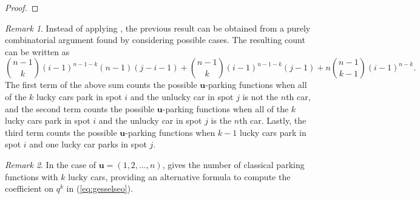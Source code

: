\documentclass[reqno]{amsart}
\theoremstyle{definition}
\theoremstyle{remark}
\newtheorem*{remark}{Remark}
\newcommand{\bsy}{\boldsymbol}
\begin{document}
\begin{proof}
\end{proof}



\begin{remark}
    Instead of applying , the previous result can be obtained from a purely combinatorial argument found by considering possible cases. The resulting count can be written as 
    \[\binom{n-1}{k}(i-1)^{n-1-k} (n-1)  (j-i-1)+ \binom{n-1}{k}(i-1)^{n-1-k}(j-1) +n\binom{n-1}{k-1}(i-1)^{n-k}.
\]
The first term of the above sum counts the possible $\bsy u$-parking functions when all of the $k$ lucky cars park in spot $i$ and the unlucky car in spot $j$ is not the $n$th car, and the second term counts the possible $\bsy u$-parking functions when all of the $k$ lucky cars park in spot $i$ and the unlucky car in spot $j$ is the $n$th car. Lastly, the third term counts the possible $\bsy u$-parking functions when $k-1$ lucky cars park in spot $i$ and one lucky car parks in spot $j$.

\end{remark}


\begin{remark}
In the case of $\bsy u = (1,2,\ldots, n)$,  gives the number of classical parking functions with $k$ lucky cars, providing an alternative formula to compute the coefficient on $q^k$ in (\ref{eq:gesselseo}).
\end{remark}
\end{document}
